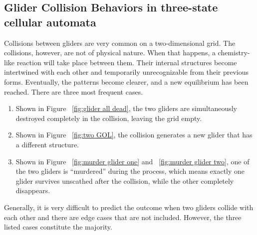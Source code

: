 \documentclass[12pt]{article}
\numberwithin{figure}{section} %
\begin{document}
\subsection{Glider Collision Behaviors in three-state cellular automata}
Collisions between gliders are very common on a two-dimensional grid. The collisions, however, are not of physical nature. When that happens, a chemistry-like reaction will take place between them. Their internal structures become intertwined with each other and temporarily unrecognizable from their previous forms. Eventually, the patterns become clearer, and a new equilibrium has been reached. There are three most frequent cases. 
\begin{enumerate}[topsep=0pt,itemsep=-1ex,partopsep=1ex,parsep=1ex]
\item Shown in Figure ~\ref{fig:glider all dead}, the two gliders are simultaneously destroyed completely in the collision, leaving the grid empty. 
\item Shown in Figure ~\ref{fig:two GOL}, the collision generates a new glider that has a different structure. 
\item Shown in Figure ~\ref{fig:murder glider one} and ~\ref{fig:murder glider two}, one of the two gliders is “murdered” during the process, which means exactly one glider survives unscathed after the collision, while the other completely disappears.
\end{enumerate}
Generally, it is very difficult to predict the outcome when two gliders collide with each other and there are edge cases that are not included. However, the three listed cases constitute the majority. 
\end{document}
